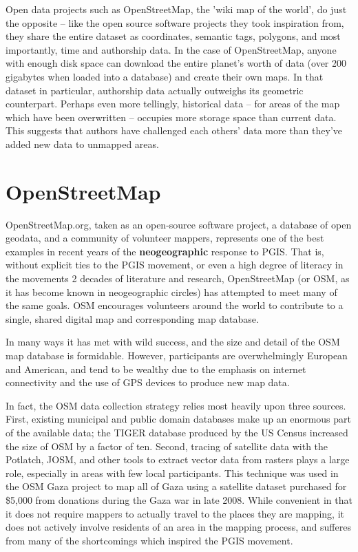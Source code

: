 \documentclass[11pt]{report}
\begin{document}
Open data projects such as OpenStreetMap, the 'wiki map of the world', do just the opposite – like the open source software projects they took inspiration from, they share the entire dataset as coordinates, semantic tags, polygons, and most importantly, time and authorship data. In the case of OpenStreetMap, anyone with enough disk space can download the entire planet's worth of data (over 200 gigabytes when loaded into a database) and create their own maps. In that dataset in particular, authorship data actually outweighs its geometric counterpart. Perhaps even more tellingly, historical data – for areas of the map which have been overwritten – occupies more storage space than current data. This suggests that authors have challenged each others' data more than they've added new data to unmapped areas. \cite{warren2009composition}

\section{OpenStreetMap}

OpenStreetMap.org, taken as an open-source software project, a database of open geodata, and a community of volunteer mappers, represents one of the best examples in recent years of the \textbf{neogeographic} response to PGIS. That is, without explicit ties to the PGIS movement, or even a high degree of literacy in the movements 2 decades of literature and research, OpenStreetMap (or OSM, as it has become known in neogeographic circles) has attempted to meet many of the same goals. OSM encourages volunteers around the world to contribute to a single, shared digital map and corresponding map database. 

In many ways it has met with wild success, and the size and detail of the OSM map database is formidable. 
However, participants are overwhelmingly European and American, and tend to be wealthy due to the emphasis on internet connectivity and the use of GPS devices to produce new map data.

In fact, the OSM data collection strategy relies most heavily upon three sources. First, existing municipal and public domain databases make up an enormous part of the available data; the TIGER database produced by the US Census increased the size of OSM by a factor of ten. Second, tracing of satellite data with the Potlatch, JOSM, and other tools to extract vector data from rasters plays a large role, especially in areas with few local participants. This technique was used in the OSM Gaza project to map all of Gaza using a satellite dataset purchased for \$5,000 from donations during the Gaza war in late 2008. \cite{maron2010openstreetmap} While convenient in that it does not require mappers to actually travel to the places they are mapping, it does not actively involve residents of an area in the mapping process, and sufferes from many of the shortcomings which inspired the PGIS movement. 
\end{document}
